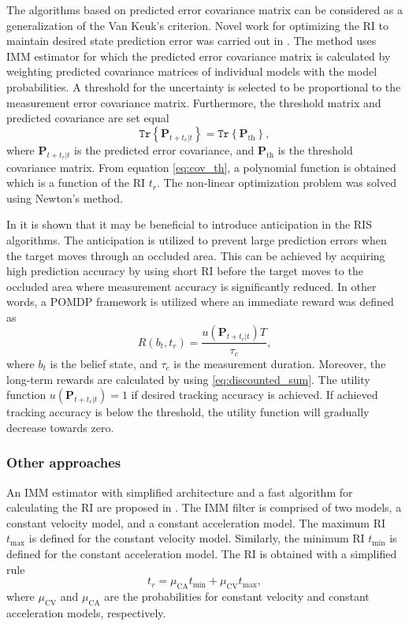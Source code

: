 \documentclass[english, 12pt, a4paper, elec, utf8, a-1b, online]{aaltothesis}
\renewcommand{\vec}[1]{\mathbf{#1}}
\newcommand{\tr}[1]{\texttt{Tr}\left\{ #1 \right\}}
\newcommand{\tmax}{t_\text{max}}
\newcommand{\tmin}{t_\text{min}}
\newcommand{\muca}{\mu_{\text{CA}}}
\newcommand{\mucv}{\mu_{\text{CV}}}
\begin{document}
The algorithms based on predicted error covariance matrix can be considered as a generalization of the Van Keuk's criterion.  
Novel work for optimizing the RI to maintain desired state prediction error was carried out in \cite{Watson1993}.
The method uses IMM estimator for which the predicted error covariance matrix is calculated by weighting predicted covariance matrices of individual models with the model probabilities.
A threshold for the uncertainty is selected to be proportional to the measurement error covariance matrix.
Furthermore, the threshold matrix and predicted covariance are set equal  
\begin{equation}\label{eq:cov_th}
    \tr{ \vec{P}_{t+t_r|t} } = \tr{ \vec{P}_{\text{th}} },
\end{equation}
where $\vec{P}_{t+t_r|t}$ is the predicted error covariance, and $\vec{P}_{\text{th}}$ is the threshold covariance matrix.
From equation \eqref{eq:cov_th}, a polynomial function is obtained which is a function of the RI $t_r$.
The non-linear optimization problem was solved using Newton's method.

In \cite{Charlish2015} it is shown that it may be beneficial to introduce anticipation in the RIS algorithms.
The anticipation is utilized to prevent large prediction errors when the target moves through an occluded area.
This can be achieved by acquiring high prediction accuracy by using short RI before the target moves to the occluded area where measurement accuracy is significantly reduced.
In other words, a POMDP framework is utilized where an immediate reward was defined as
\begin{equation}
    R(b_t, t_r) = \frac{u\left(\vec{P}_{t+t_r|t} \right) T}{\tau_c},
\end{equation}
where $b_t$ is the belief state, and $\tau_c$ is the measurement duration.
Moreover, the long-term rewards are calculated by using \eqref{eq:discounted_sum}.
The utility function $u\left(\vec{P}_{t+t_r|t} \right)=1$ if desired tracking accuracy is achieved.
If achieved tracking accuracy is below the threshold, the utility function will gradually decrease towards zero.


\subsubsection{Other approaches}


 An IMM estimator with simplified architecture and a fast algorithm for calculating the RI are proposed in \cite{Benoudnine2006}.
The IMM filter is comprised of two models, a constant velocity model, and a constant acceleration model.
The maximum RI $\tmax$ is defined for the constant velocity model.
Similarly, the minimum RI $\tmin$ is defined for the constant acceleration model.
The RI is obtained with a simplified rule
\begin{equation}\label{eq:fimm}
    t_r = \muca \tmin + \mucv \tmax,
\end{equation}
where $\mucv$ and $\muca$ are the probabilities for constant velocity and constant acceleration models, respectively.
\end{document}
